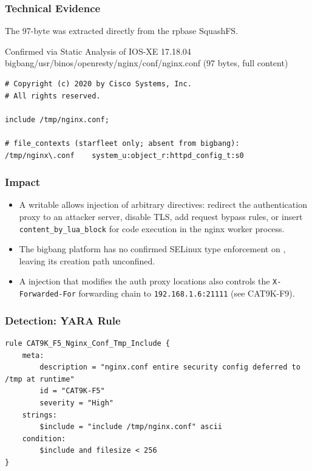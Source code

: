 \documentclass[11pt,a4paper]{article}
\begin{document}
\subsubsection{Technical Evidence}

The 97-byte  was extracted
directly from the rpbase SquashFS.

\begin{pocbox}{Confirmed via Static Analysis of IOS-XE 17.18.04 bigbang/usr/binos/openresty/nginx/conf/nginx.conf (97 bytes, full content)}
\begin{lstlisting}
# Copyright (c) 2020 by Cisco Systems, Inc.
# All rights reserved.

include /tmp/nginx.conf;

# file_contexts (starfleet only; absent from bigbang):
/tmp/nginx\.conf    system_u:object_r:httpd_config_t:s0
\end{lstlisting}
\end{pocbox}

\subsubsection{Impact}

\begin{itemize}[nosep]
  \item A writable  allows injection of arbitrary directives:
    redirect the authentication proxy to an attacker server, disable TLS, add request
    bypass rules, or insert \texttt{content\_by\_lua\_block} for code execution in
    the nginx worker process.
  \item The bigbang platform has no confirmed SELinux type enforcement on
    , leaving its creation path unconfined.
  \item A  injection that modifies the auth proxy locations
    also controls the \texttt{X-Forwarded-For} forwarding chain to
    \texttt{192.168.1.6:21111} (see CAT9K-F9).
\end{itemize}

\subsubsection{Detection: YARA Rule}

\begin{lstlisting}[style=yara]
rule CAT9K_F5_Nginx_Conf_Tmp_Include {
    meta:
        description = "nginx.conf entire security config deferred to /tmp at runtime"
        id = "CAT9K-F5"
        severity = "High"
    strings:
        $include = "include /tmp/nginx.conf" ascii
    condition:
        $include and filesize < 256
}
\end{lstlisting}
\end{document}
